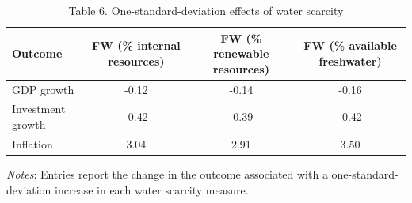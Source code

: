\begin{table}[htbp]
\centering
\caption{Table 6. One-standard-deviation effects of water scarcity}
\small
\begin{tabular}{lccc}
\hline
Outcome & FW (\% internal resources) & FW (\% renewable resources) & FW (\% available freshwater) \\
\hline
GDP growth & -0.12 & -0.14 & -0.16 \\
Investment growth & -0.42 & -0.39 & -0.42 \\
Inflation & 3.04 & 2.91 & 3.50 \\
\hline
\end{tabular}
\vspace{0.5em}
\parbox{0.95\textwidth}{\footnotesize \textit{Notes}: Entries report the change in the outcome associated with a one-standard-deviation increase in each water scarcity measure.}
\end{table}
